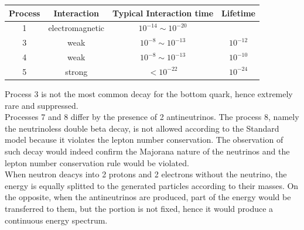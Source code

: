 \begin{table}[hbtp]
    \centering 
    \begin{tabular}{cccc}
        \toprule
            Process & Interaction & Typical Interaction time & Lifetime \\
        \midrule
            1 & electromagnetic & $10^{-14} \sim 10^{-20}$ & \\
            3 & weak & $10^{-8} \sim 10^{-13}$ & $10^{-12}$ \\
            4 & weak & $10^{-8} \sim 10^{-13}$ & $10^{-10}$ \\
            5 & strong & $<10^{-22}$ & $10^{-24}$ \\
        \bottomrule
    \end{tabular}
\end{table}

Process 3 is not the most common decay for the bottom quark, hence extremely rare and suppressed. \\
Processes 7 and 8 differ by the presence of 2 antineutrinos. The process 8, namely the neutrinoless double beta decay,
is not allowed according to the Standard model because it violates the lepton number conservation. The observation of such 
decay would indeed confirm the Majorana nature of the neutrinos and the lepton number conservation rule would be violated. \\
When neutron deacys into 2 protons and 2 electrons without the neutrino, the energy is equally splitted to the generated particles 
according to their masses. On the opposite, when the antineutrinos are produced, part of the energy would be transferred to them,
but the portion is not fixed, hence it would produce a continuous energy spectrum.

